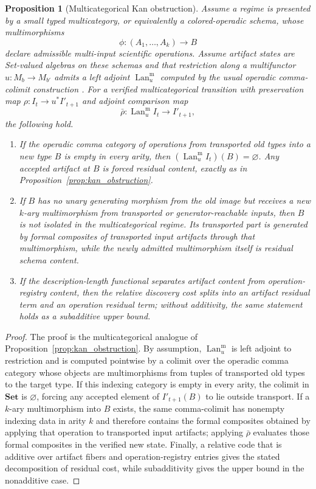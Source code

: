 \documentclass[11pt]{article}
\newtheorem{proposition}[theorem]{Proposition}
\theoremstyle{definition}
\newcommand{\Set}{\mathbf{Set}}
\newcommand{\Lan}{\operatorname{Lan}}
\begin{document}
\begin{proposition}[Multicategorical Kan obstruction]
\label{prop:multicat_kan}
Assume a regime is presented by a small typed multicategory, or equivalently a colored-operadic schema, whose multimorphisms
\[
\phi:(A_1,\ldots,A_k)\longrightarrow B
\]
declare admissible multi-input scientific operations. Assume artifact states are Set-valued algebras on these schemas and that restriction along a multifunctor $u:M_b\to M_{b'}$ admits a left adjoint $\Lan^{\mathrm m}_u$ computed by the usual operadic comma-colimit construction \citep{leinster_higher_operads_2004}. For a verified multicategorical transition with preservation map $\rho:I_t\to u^*I'_{t+1}$ and adjoint comparison map
\[
\bar\rho:\Lan^{\mathrm m}_u I_t\longrightarrow I'_{t+1},
\]
the following hold.
\begin{enumerate}[leftmargin=1.7em,topsep=2pt,itemsep=2pt]
    \item If the operadic comma category of operations from transported old types into a new type $B$ is empty in every arity, then $(\Lan^{\mathrm m}_u I_t)(B)=\varnothing$. Any accepted artifact at $B$ is forced residual content, exactly as in Proposition~\ref{prop:kan_obstruction}.
    \item If $B$ has no unary generating morphism from the old image but receives a new $k$-ary multimorphism from transported or generator-reachable inputs, then $B$ is not isolated in the multicategorical regime. Its transported part is generated by formal composites of transported input artifacts through that multimorphism, while the newly admitted multimorphism itself is residual schema content.
    \item If the description-length functional separates artifact content from operation-registry content, then the relative discovery cost splits into an artifact residual term and an operation residual term; without additivity, the same statement holds as a subadditive upper bound.
\end{enumerate}
\end{proposition}

\begin{proof}
The proof is the multicategorical analogue of Proposition~\ref{prop:kan_obstruction}. By assumption, $\Lan^{\mathrm m}_u$ is left adjoint to restriction and is computed pointwise by a colimit over the operadic comma category whose objects are multimorphisms from tuples of transported old types to the target type. If this indexing category is empty in every arity, the colimit in $\Set$ is $\varnothing$, forcing any accepted element of $I'_{t+1}(B)$ to lie outside transport. If a $k$-ary multimorphism into $B$ exists, the same comma-colimit has nonempty indexing data in arity $k$ and therefore contains the formal composites obtained by applying that operation to transported input artifacts; applying $\bar\rho$ evaluates those formal composites in the verified new state. Finally, a relative code that is additive over artifact fibers and operation-registry entries gives the stated decomposition of residual cost, while subadditivity gives the upper bound in the nonadditive case.
\end{proof}
\end{document}
